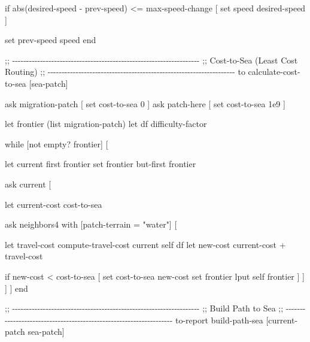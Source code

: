 \documentclass[
]{book}
\newenvironment{Shaded}{\begin{snugshade}}{\end{snugshade}}
\newcommand{\NormalTok}[1]{#1}
\begin{document}
\begin{Shaded}
\begin{Highlighting}[]
\NormalTok{  if abs(desired{-}speed {-} prev{-}speed) \textless{}= max{-}speed{-}change [}
\NormalTok{    set speed desired{-}speed}
\NormalTok{  ]}

\NormalTok{  set prev{-}speed speed}
\NormalTok{end}


\NormalTok{;; {-}{-}{-}{-}{-}{-}{-}{-}{-}{-}{-}{-}{-}{-}{-}{-}{-}{-}{-}{-}{-}{-}{-}{-}{-}{-}{-}{-}{-}{-}{-}{-}{-}{-}{-}{-}{-}{-}{-}{-}{-}{-}{-}{-}{-}{-}{-}{-}{-}{-}{-}{-}{-}{-}{-}{-}{-}{-}{-}{-}{-}{-}{-}{-}{-}{-}{-}}
\NormalTok{;;  Cost{-}to{-}Sea (Least Cost Routing)}
\NormalTok{;; {-}{-}{-}{-}{-}{-}{-}{-}{-}{-}{-}{-}{-}{-}{-}{-}{-}{-}{-}{-}{-}{-}{-}{-}{-}{-}{-}{-}{-}{-}{-}{-}{-}{-}{-}{-}{-}{-}{-}{-}{-}{-}{-}{-}{-}{-}{-}{-}{-}{-}{-}{-}{-}{-}{-}{-}{-}{-}{-}{-}{-}{-}{-}{-}{-}{-}{-}}
\NormalTok{to calculate{-}cost{-}to{-}sea [sea{-}patch]}

\NormalTok{  ask migration{-}patch [ set cost{-}to{-}sea 0 ]}
\NormalTok{  ask patch{-}here     [ set cost{-}to{-}sea 1e9 ]}

\NormalTok{  let frontier (list migration{-}patch)}
\NormalTok{  let df difficulty{-}factor}

\NormalTok{  while [not empty? frontier] [}

\NormalTok{    let current first frontier}
\NormalTok{    set frontier but{-}first frontier}

\NormalTok{    ask current [}

\NormalTok{      let current{-}cost cost{-}to{-}sea}

\NormalTok{      ask neighbors4 with [patch{-}terrain = "water"] [}

\NormalTok{        let travel{-}cost compute{-}travel{-}cost current self df}
\NormalTok{        let new{-}cost current{-}cost + travel{-}cost}

\NormalTok{        if new{-}cost \textless{} cost{-}to{-}sea [}
\NormalTok{          set cost{-}to{-}sea new{-}cost}
\NormalTok{          set frontier lput self frontier}
\NormalTok{        ]}
\NormalTok{      ]}
\NormalTok{    ]}
\NormalTok{  ]}
\NormalTok{end}


\NormalTok{;; {-}{-}{-}{-}{-}{-}{-}{-}{-}{-}{-}{-}{-}{-}{-}{-}{-}{-}{-}{-}{-}{-}{-}{-}{-}{-}{-}{-}{-}{-}{-}{-}{-}{-}{-}{-}{-}{-}{-}{-}{-}{-}{-}{-}{-}{-}{-}{-}{-}{-}{-}{-}{-}{-}{-}{-}{-}{-}{-}{-}{-}{-}{-}{-}{-}{-}{-}}
\NormalTok{;;  Build Path to Sea}
\NormalTok{;; {-}{-}{-}{-}{-}{-}{-}{-}{-}{-}{-}{-}{-}{-}{-}{-}{-}{-}{-}{-}{-}{-}{-}{-}{-}{-}{-}{-}{-}{-}{-}{-}{-}{-}{-}{-}{-}{-}{-}{-}{-}{-}{-}{-}{-}{-}{-}{-}{-}{-}{-}{-}{-}{-}{-}{-}{-}{-}{-}{-}{-}{-}{-}{-}{-}{-}{-}}
\NormalTok{to{-}report build{-}path{-}sea [current{-}patch sea{-}patch]}


\end{Highlighting}
\end{Shaded}
\end{document}
